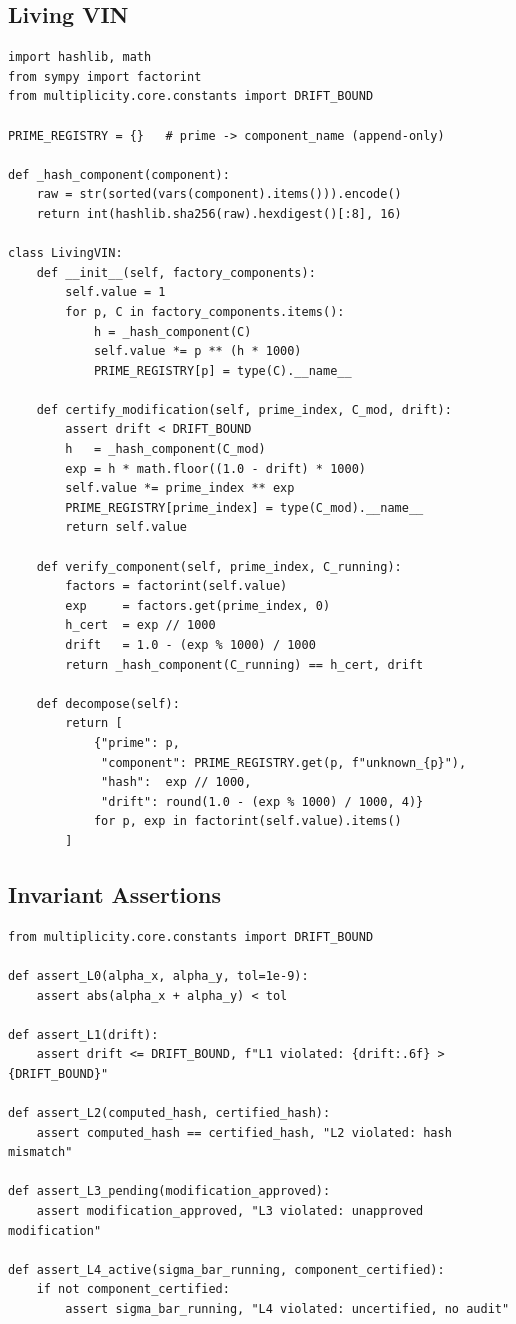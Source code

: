 \documentclass[12pt,letterpaper]{article}
\begin{document}
\subsection{Living VIN}
\begin{lstlisting}[caption={mirror\_dissonance/vin.py}]
import hashlib, math
from sympy import factorint
from multiplicity.core.constants import DRIFT_BOUND

PRIME_REGISTRY = {}   # prime -> component_name (append-only)

def _hash_component(component):
    raw = str(sorted(vars(component).items())).encode()
    return int(hashlib.sha256(raw).hexdigest()[:8], 16)

class LivingVIN:
    def __init__(self, factory_components):
        self.value = 1
        for p, C in factory_components.items():
            h = _hash_component(C)
            self.value *= p ** (h * 1000)
            PRIME_REGISTRY[p] = type(C).__name__

    def certify_modification(self, prime_index, C_mod, drift):
        assert drift < DRIFT_BOUND
        h   = _hash_component(C_mod)
        exp = h * math.floor((1.0 - drift) * 1000)
        self.value *= prime_index ** exp
        PRIME_REGISTRY[prime_index] = type(C_mod).__name__
        return self.value

    def verify_component(self, prime_index, C_running):
        factors = factorint(self.value)
        exp     = factors.get(prime_index, 0)
        h_cert  = exp // 1000
        drift   = 1.0 - (exp % 1000) / 1000
        return _hash_component(C_running) == h_cert, drift

    def decompose(self):
        return [
            {"prime": p,
             "component": PRIME_REGISTRY.get(p, f"unknown_{p}"),
             "hash":  exp // 1000,
             "drift": round(1.0 - (exp % 1000) / 1000, 4)}
            for p, exp in factorint(self.value).items()
        ]
\end{lstlisting}

\subsection{Invariant Assertions}
\begin{lstlisting}[caption={multiplicity/core/invariants.py}]
from multiplicity.core.constants import DRIFT_BOUND

def assert_L0(alpha_x, alpha_y, tol=1e-9):
    assert abs(alpha_x + alpha_y) < tol

def assert_L1(drift):
    assert drift <= DRIFT_BOUND, f"L1 violated: {drift:.6f} > {DRIFT_BOUND}"

def assert_L2(computed_hash, certified_hash):
    assert computed_hash == certified_hash, "L2 violated: hash mismatch"

def assert_L3_pending(modification_approved):
    assert modification_approved, "L3 violated: unapproved modification"

def assert_L4_active(sigma_bar_running, component_certified):
    if not component_certified:
        assert sigma_bar_running, "L4 violated: uncertified, no audit"
\end{lstlisting}
\end{document}
